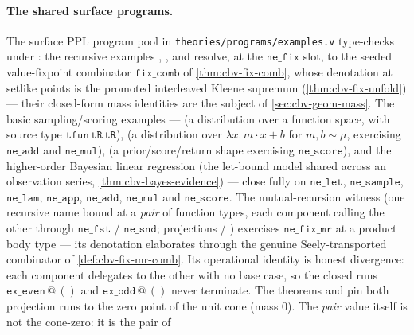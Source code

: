 \paragraph{The shared surface programs.}
The surface PPL program pool in
\texttt{theories/programs/examples.v} type-checks under
: the recursive examples
,
,
 and
 resolve, at the
$\mathtt{ne\_fix}$ slot, to the seeded value-fixpoint combinator
$\mathtt{fix\_comb}$ of \autoref{thm:cbv-fix-comb}, whose denotation
at setlike points is the promoted interleaved Kleene supremum
(\autoref{thm:cbv-fix-unfold}) --- their closed-form mass identities
are the subject of \autoref{sec:cbv-geom-mass}. The basic
sampling/scoring examples ---
 (a distribution
over a function space, with source type
$\mathtt{tfun}\,\mathtt{tR}\,\mathtt{tR}$),
 (a distribution over
$\lambda x.\,m\cdot x + b$ for $m, b \sim \mu$, exercising
$\mathtt{ne\_add}$ and $\mathtt{ne\_mul}$),
 (a
prior/score/return shape exercising $\mathtt{ne\_score}$), and the
higher-order Bayesian linear regression
 (the let-bound model
shared across an observation series,
\autoref{thm:cbv-bayes-evidence}) --- close fully on
$\mathtt{ne\_let}$, $\mathtt{ne\_sample}$, $\mathtt{ne\_lam}$,
$\mathtt{ne\_app}$, $\mathtt{ne\_add}$, $\mathtt{ne\_mul}$ and
$\mathtt{ne\_score}$. The mutual-recursion witness
 (one recursive name
bound at a \emph{pair} of function types, each component calling the
other through $\mathtt{ne\_fst}$ / $\mathtt{ne\_snd}$; projections
 /
) exercises
$\mathtt{ne\_fix\_mr}$ at a product body type --- its denotation
elaborates through the genuine Seely-transported combinator of
\autoref{def:cbv-fix-mr-comb}. Its operational identity is honest
divergence: each component delegates to the other with no base case,
so the closed runs $\mathtt{ex\_even}\,@\,()$ and
$\mathtt{ex\_odd}\,@\,()$ never terminate. The theorems
 and
 pin both
projection runs to the zero point of the unit cone (mass $0$). The
\emph{pair} value itself is not the cone-zero: it is the pair of
